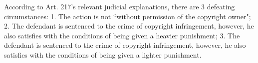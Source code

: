 \documentclass{IOS-Book-Article}
\begin{document}
%
According to Art. 217's relevant judicial explanations, there are 3 defeating circumstances: 1. The action is not ``without permission of the copyright owner"; 2. The defendant is sentenced to the crime of copyright infringement, however, he also satisfies with the conditions of being given a heavier punishment; 3. The defendant is sentenced to the crime of copyright infringement, however, he also satisfies with the conditions of being given a lighter punishment.

\end{document}

